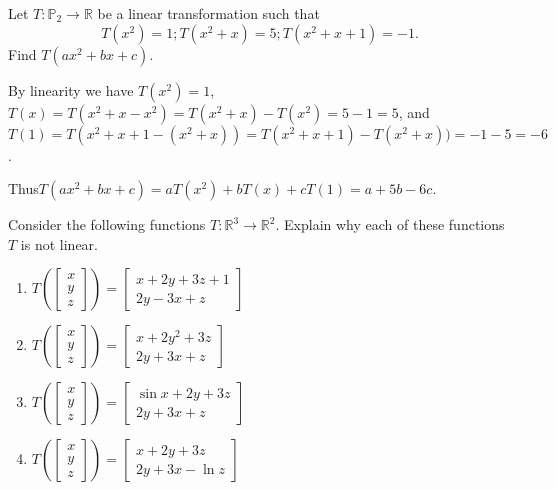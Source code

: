 \documentclass{ximera}
\begin{document}
\begin{problem}\label{prb:10.68}
Let $T:\mathbb{P}_2 \to \mathbb{R}$ be a linear transformation such that
\[ T(x^2)=1; T(x^2+x)=5; T(x^2+x+1)=-1.\]
Find $T(ax^2+bx+c)$.
\begin{hint}
By linearity we have
$T(x^2)=1$, $T(x) = T(x^2+x - x^2)= T(x^2+x) - T(x^2)= 5-1=5$, and
$T(1) = T(x^2+x+1 -(x^2+x))=T(x^2+x+1) -T(x^2+x))= -1-5=-6$.

Thus$T(ax^2+bx+c) = aT(x^2) + bT(x) + cT(1) = a+5b-6c$.
\end{hint}
\end{problem}

\begin{problem}\label{prb:10.69} Consider the following functions $T:\mathbb{R}^{3}\rightarrow \mathbb{R}^{2}.$
Explain why each of these functions $T$ is not linear.

\begin{enumerate}
\item $T\left(\left[
\begin{array}{c}
x \\
y \\
z
\end{array}
\right]\right) =\left[
\begin{array}{c}
x+2y+3z+1 \\
2y-3x+z
\end{array}
\right] $

\item $T\left(\left[
\begin{array}{c}
x \\
y \\
z
\end{array}
\right]\right) =\left[
\begin{array}{c}
x+2y^{2}+3z \\
2y+3x+z
\end{array}
\right] $

\item $T\left(\left[
\begin{array}{c}
x \\
y \\
z
\end{array}
\right]\right) =\left[
\begin{array}{c}
\sin x+2y+3z \\
2y+3x+z
\end{array}
\right] $

\item $T\left(\left[
\begin{array}{c}
x \\
y \\
z
\end{array}
\right]\right) =\left[
\begin{array}{c}
x+2y+3z \\
2y+3x-\ln z
\end{array}
\right] $
\end{enumerate}
\end{problem}
\end{document}
